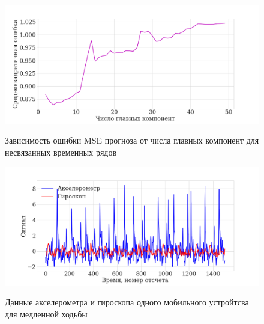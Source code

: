 \documentclass[12pt]{extarticle}
\begin{document}
\begin{figure}[h!]
\centering
{\includegraphics[width=1\textwidth]{./images/ERROR2_new.png}}
\caption{Зависимость ошибки MSE прогноза от числа главных компонент для несвязанных временных рядов}
\label{fg:error_uncorr}
\end{figure}


\begin{figure}[!htbp]
\centering
{\includegraphics[width=1.1\textwidth]{./images/signal_long_new-2.png}}
\caption{Данные акселерометра и гироскопа одного мобильного устройтсва для медленной ходьбы}
\label{fg:long_signal}
\end{figure}
\end{document}
